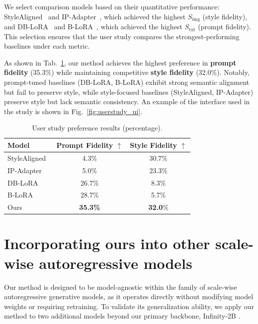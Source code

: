 \documentclass[10pt,twocolumn,letterpaper]{article}
\newcommand{\figref}[1]{Fig.~\ref{#1}}
\newcommand{\tabref}[1]{Tab.~\ref{#1}}
\begin{document}
We select comparison models based on their quantitative performance: StyleAligned~\cite{hertz2024stylealignedimagegeneration} and IP-Adapter~\cite{ye2023ipadaptertextcompatibleimage}, which achieved the highest $S_{\text{img}}$ (style fidelity), and DB-LoRA~\cite{ryu2023low} and B-LoRA~\cite{frenkel2024implicitstylecontentseparationusing}, which achieved the highest $S_{\text{txt}}$ (prompt fidelity). This selection ensures that the user study compares the strongest-performing baselines under each metric.

As shown in \tabref{tab:userstudy}, our method achieves the highest preference in \textbf{prompt fidelity} (35.3\%) while maintaining competitive \textbf{style fidelity} (32.0\%). Notably, prompt-tuned baselines (DB-LoRA, B-LoRA) exhibit strong semantic alignment but fail to preserve style, while style-focused baselines (StyleAligned, IP-Adapter) preserve style but lack semantic consistency. An example of the interface used in the study is shown in \figref{fig:userstudy_ui}.

\begin{table}[h]
	\centering
	\caption{User study preference results (percentage).}
	\label{tab:userstudy}
	\small
	\begin{tabular}{lcc}
		\toprule
		\textbf{Model} & \textbf{Prompt Fidelity $\uparrow$} & \textbf{Style Fidelity $\uparrow$} \\
		\midrule
		StyleAligned~\cite{hertz2024stylealignedimagegeneration} & 4.3\% & 30.7\% \\
		IP-Adapter~\cite{ye2023ipadaptertextcompatibleimage} & 5.0\% & 23.3\% \\
		DB-LoRA~\cite{ryu2023low} & 26.7\% & 8.3\% \\
		B-LoRA~\cite{frenkel2024implicitstylecontentseparationusing} & 28.7\% & 5.7\% \\
		\midrule
		Ours & \textbf{35.3\%} & \textbf{32.0}\% \\
		\bottomrule
	\end{tabular}
\end{table}


\section{Incorporating ours into other scale-wise autoregressive models} 

Our method is designed to be model-agnostic within the family of scale-wise autoregressive generative models, as it operates directly without modifying model weights or requiring retraining. To validate its generalization ability, we apply our method to two additional models beyond our primary backbone, Infinity-2B \cite{han2025infinity}.
\end{document}
